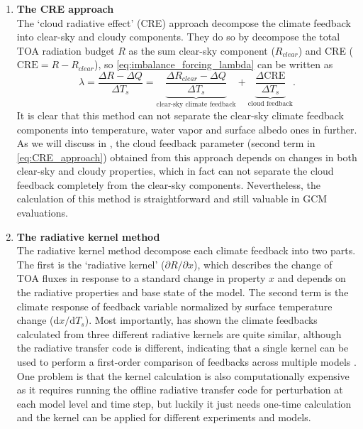 \begin{enumerate}[label={(\arabic*)}]
    \item \textbf{The CRE approach}\\
    The `cloud radiative effect' (CRE) approach \citep[or CRF in][]{Cess1990intercomparison, Cess1996cloud} decompose the climate feedback into clear-sky and cloudy components. They do so by decompose the total TOA radiation budget $R$ as the sum clear-sky component ($R_{clear}$) and CRE ($\mathrm{CRE}=R-R_{clear}$), so \eqref{eq:imbalance_forcing_lambda} can be written as
    \begin{equation}
        \lambda = \frac{\Delta R - \Delta Q}{\Delta T_s} = \underbrace{\frac{\Delta R_{clear} - \Delta Q}{\Delta T_s}}_{\text{clear-sky climate feedback}} + \underbrace{\frac{\Delta\mathrm{CRE}}{\Delta T_s}}_{\text{cloud feedback}}.
        \label{eq:CRE_approach}
    \end{equation}
    It is clear that this method can not separate the clear-sky climate feedback components into temperature, water vapor and surface albedo ones in further. As we will discuss in , the cloud feedback parameter (second term in \eqref{eq:CRE_approach}) obtained from this approach depends on changes in both clear-sky and cloudy properties, which in fact can not separate the cloud feedback completely from the clear-sky components. Nevertheless, the calculation of this method is straightforward and still valuable in GCM evaluations.
    
    \item \textbf{The radiative kernel method}\\
    The radiative kernel method \citep[e.g.,][]{Soden2006,Soden2008,Shell2008} decompose each climate feedback into two parts. The first is the `radiative kernel' ($\partial R/\partial x$), which describes the change of TOA fluxes in response to a standard change in property $x$ and depends on the radiative properties and base state of the model. The second term is the climate response of feedback variable normalized by surface temperature change ($\mathrm{d} x/\mathrm{d} T_s$). Most importantly, \cite{Soden2008} has shown the climate feedbacks calculated from three different radiative kernels are quite similar, although the radiative transfer code is different, indicating that a single kernel can be used to perform a first-order comparison of feedbacks across multiple models \citep{Shell2008}. One problem is that the kernel calculation is also computationally expensive as it requires running the offline radiative transfer code for perturbation at each model level and time step, but luckily it just needs one-time calculation and the kernel can be applied for different experiments and models. %
\end{enumerate}   
    
